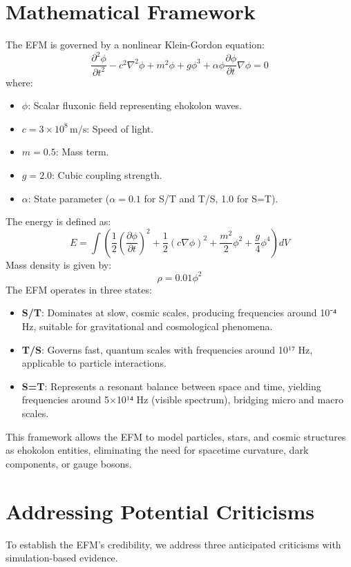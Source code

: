 \documentclass[11pt]{article}
\begin{document}
\section{Mathematical Framework}
The EFM is governed by a nonlinear Klein-Gordon equation:
\begin{equation}
\frac{\partial^2 \phi}{\partial t^2} - c^2 \nabla^2 \phi + m^2 \phi + g \phi^3 + \alpha \phi \frac{\partial \phi}{\partial t} \nabla \phi = 0
\end{equation}
where:
\begin{itemize}
    \item \(\phi\): Scalar fluxonic field representing ehokolon waves.
    \item \(c = 3 \times 10^8 \, \text{m/s}\): Speed of light.
    \item \(m = 0.5\): Mass term.
    \item \(g = 2.0\): Cubic coupling strength.
    \item \(\alpha\): State parameter (\(\alpha = 0.1\) for S/T and T/S, 1.0 for S=T).
\end{itemize}
The energy is defined as:
\begin{equation}
E = \int \left( \frac{1}{2} \left(\frac{\partial \phi}{\partial t}\right)^2 + \frac{1}{2} (c \nabla \phi)^2 + \frac{m^2}{2} \phi^2 + \frac{g}{4} \phi^4 \right) dV
\end{equation}
Mass density is given by:
\begin{equation}
\rho = 0.01 \phi^2
\end{equation}
The EFM operates in three states:
\begin{itemize}
    \item \textbf{S/T}: Dominates at slow, cosmic scales, producing frequencies around 10⁻⁴ Hz, suitable for gravitational and cosmological phenomena.
    \item \textbf{T/S}: Governs fast, quantum scales with frequencies around 10¹⁷ Hz, applicable to particle interactions.
    \item \textbf{S=T}: Represents a resonant balance between space and time, yielding frequencies around 5$\times$10¹⁴ Hz (visible spectrum), bridging micro and macro scales.
\end{itemize}
This framework allows the EFM to model particles, stars, and cosmic structures as ehokolon entities, eliminating the need for spacetime curvature, dark components, or gauge bosons.

\section{Addressing Potential Criticisms}
To establish the EFM’s credibility, we address three anticipated criticisms with simulation-based evidence.
\end{document}
